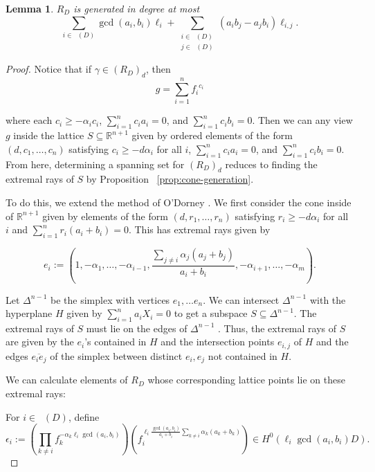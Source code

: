 \documentclass{amsart}
\theoremstyle{plain}
\newtheorem{lem}[thm]{Lemma}
\theoremstyle{definition}
\theoremstyle{remark}
\numberwithin{equation}{section}
\newcommand\bida{a}
\newcommand\bidb{b}
\DeclareMathOperator{\Te}{T_=}
\DeclareMathOperator{\Tp}{T_+}
\DeclareMathOperator{\Tm}{T_-}
\begin{document}
\begin{lem}
\label{lem:hirz-generators}
$R_D$ is generated in degree at most
\[
	\sum_{i \in \Te(D)} \gcd(\bida_i, \bidb_i) \ell_i + \sum_{\substack
	{i \in \Tp(D) \\ j\in \Tm(D)}} (\bida_i \bidb_j - \bida_j \bidb_i)
	\ell	_{i,j}.
\]
\end{lem}

\begin{proof}
Notice that if $\gamma
\in (R_D)_d$, then 
\[
	g = \sum_{i = 1}^n {f_i}^{c_i}
\]

\noindent
where each $c_i \ge - \alpha_i c_i$, $\sum_{i=1}^n c_i \bida_i = 0$,
and $\sum_{i=1}^n c_i \bidb_i = 0$. Then we can any view $g$ inside the
lattice $S \subseteq \mathbb{R}^{n + 1}$ given by ordered elements of
the form $(d, c_1, \ldots, c_n)$ satisfying $c_i \ge - d \alpha_i$
for all $i$, $\sum_{i=1}^n c_i \bida_i = 0$, and $\sum_{i = 1}^n c_i \bidb_i =
 0$. From here, determining a spanning set for $(R_D)_d$ reduces to
finding the extremal rays of $S$ by Proposition ~\ref{prop:cone-generation}.

To do this, we extend the method of O'Dorney \cite[Theorem 8]{dorney:canonical}. 
We first consider the cone inside of $\mathbb{R}^{n+1}$ given by elements of the
form $(d, r_1, \ldots, r_n)$ satisfying $r_i \ge -d \alpha_i$ for
all $i$ and $\sum_{i = 1}^n r_i (\bida_i + \bidb_i) = 0$.  This
has extremal rays given by
 
\[
	e_i := (1, -\alpha_1, \ldots, -\alpha_{i-1}, \frac{\sum_{j \ne i}
	\alpha_j (\bida_j + \bidb_j)}{\bida_i + \bidb_i}, -\alpha_{i + 1},
	\ldots, -\alpha_m).
\]

Let $\Delta^{n-1}$ be the simplex with vertices $e_1, \ldots e_n$.
We can intersect $\Delta^{n-1}$ with the hyperplane $H$ given by
$\sum_{i=1}^n \bida_i X_i = 0$  to get a subspace $S \subseteq \Delta
^{n-1}$. The extremal rays of $S$ must lie on the edges of $\Delta
^{n - 1}$ .
Thus, the extremal rays of $S$ are given by the $e_i$'s
contained in $H$ and the intersection points $e_{i, j}$ of $H$
and the edges $\overline{e_i e_j}$ of the simplex between
distinct $e_i, e_j$ not contained in $H$.

We can calculate elements of $R_D$ whose
corresponding lattice points lie on these extremal rays:

For $i \in \Te(D)$, define 
\[
	\epsilon_i := (\prod_{k \ne i} f_k^{-\alpha_k \ell_i \gcd(\bida_i, \bidb_i)})
	(f_i^{\ell_i \frac{\gcd(\bida_i, \bidb_i)}{\bida_i + \bidb_i}\sum_{k \ne i}
	\alpha_k (\bida_k + \bidb_k)}) \in H^0(\ell_i \gcd(\bida_i, \bidb_i) D).
\]


\end{proof}
\end{document}
